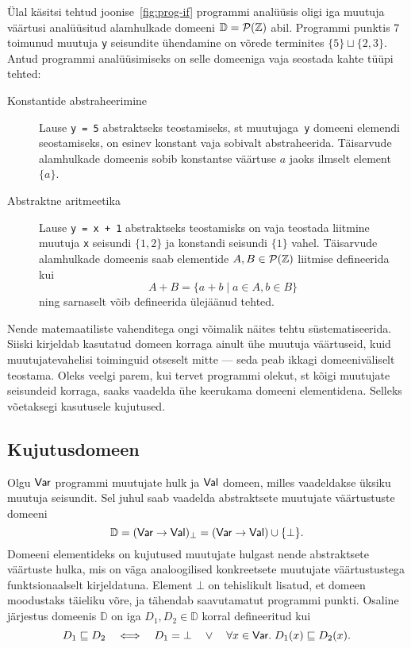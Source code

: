 \documentclass[../thesis.tex]{subfiles}
\begin{document}
Ülal käsitsi tehtud joonise~\ref{fig:prog-if} programmi analüüsis oligi iga muutuja väärtusi analüüsitud alamhulkade domeeni $\mathbb{D} = \mathcal{P}(\mathbb{Z})$ abil. Programmi punktis 7 toimunud muutuja \texttt{y} seisundite ühendamine on võrede terminites $\{5\} \sqcup \{2, 3\}$. Antud programmi analüüsimiseks on selle domeeniga vaja seostada kahte tüüpi tehted:
\begin{description}
	\item[Konstantide abstraheerimine] Lause \texttt{y = 5} abstraktseks teostamiseks, st muutujaga~\texttt{y} domeeni elemendi seostamiseks, on esinev konstant vaja sobivalt abstraheerida. Täisarvude alamhulkade domeenis sobib konstantse väärtuse $a$ jaoks ilmselt element $\{a\}$.

	\item[Abstraktne aritmeetika] Lause \texttt{y = x + 1} abstraktseks teostamisks on vaja teostada liitmine muutuja \texttt{x} seisundi $\{1, 2\}$ ja konstandi seisundi $\{1\}$ vahel. Täisarvude alamhulkade domeenis saab elementide $A, B \in \mathcal{P}(\mathbb{Z})$ liitmise defineerida kui
	\[
		A + B = \{a + b \mid a \in A, b \in B\}
	\]
	ning sarnaselt võib defineerida ülejäänud tehted.
\end{description}

Nende matemaatiliste vahenditega ongi võimalik näites tehtu süstematiseerida. Siiski kirjeldab kasutatud domeen korraga ainult ühe muutuja väärtuseid, kuid muutujatevahelisi toiminguid otseselt mitte --- seda peab ikkagi domeeniväliselt teostama. Oleks veelgi parem, kui tervet programmi olekut, st kõigi muutujate seisundeid korraga, saaks vaadelda ühe keerukama domeeni elementidena. Selleks võetaksegi kasutusele kujutused.


\subsection{Kujutusdomeen}
Olgu $\mathsf{Var}$ programmi muutujate hulk ja $\mathsf{Val}$ domeen, milles vaadeldakse üksiku muutuja seisundit. Sel juhul saab vaadelda abstraktsete muutujate väärtustuste domeeni~\cite[45]{seidl_foundations}
\[
	\mathbb{D} = (\mathsf{Var} \to \mathsf{Val})_\bot = (\mathsf{Var} \to \mathsf{Val}) \cup \{\bot\}.
\]
Domeeni elementideks on kujutused muutujate hulgast nende abstraktsete väärtuste hulka, mis on väga analoogilised konkreetsete muutujate väärtustustega funktsionaalselt kirjeldatuna. Element $\bot$ on tehislikult lisatud, et domeen moodustaks täieliku võre, ja tähendab saavutamatut programmi punkti. Osaline järjestus domeenis $\mathbb{D}$ on iga $D_1, D_2 \in \mathbb{D}$ korral defineeritud kui
\[
	D_1 \sqsubseteq D_2 \quad\Longleftrightarrow\quad D_1 = \bot \quad\lor\quad \forall x \in \mathsf{Var}.\; D_1(x) \sqsubseteq D_2(x).
\]
\end{document}
